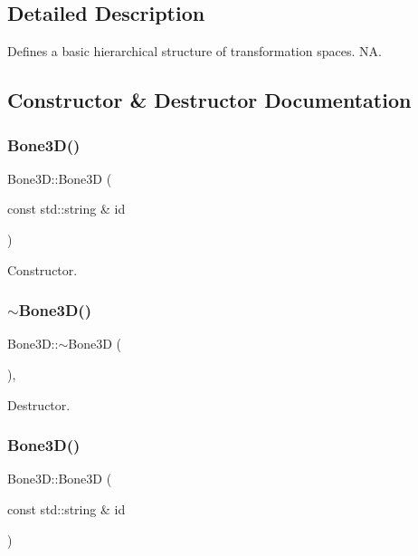 \subsection{Detailed Description}
Defines a basic hierarchical structure of transformation spaces.  NA. 

\subsection{Constructor \& Destructor Documentation}
\mbox{\label{classBone3D_a3e3acf00c8e4393609c241f82db764b7}} 
\subsubsection{\texorpdfstring{Bone3\+D()}{Bone3D()}\hspace{0.1cm}{\footnotesize\ttfamily [1/2]}}
{\footnotesize\ttfamily Bone3\+D\+::\+Bone3D (\begin{DoxyParamCaption}\item[{const std\+::string \&}]{id }\end{DoxyParamCaption})\hspace{0.3cm}{\ttfamily [protected]}}

Constructor. \mbox{\label{classBone3D_a98adf937eb08c046d99154ba66c9699d}} 
\subsubsection{\texorpdfstring{$\sim$\+Bone3\+D()}{~Bone3D()}\hspace{0.1cm}{\footnotesize\ttfamily [1/2]}}
{\footnotesize\ttfamily Bone3\+D\+::$\sim$\+Bone3D (\begin{DoxyParamCaption}{ }\end{DoxyParamCaption})\hspace{0.3cm}{\ttfamily [protected]}, {\ttfamily [virtual]}}

Destructor. \mbox{\label{classBone3D_a3e3acf00c8e4393609c241f82db764b7}} 
\subsubsection{\texorpdfstring{Bone3\+D()}{Bone3D()}\hspace{0.1cm}{\footnotesize\ttfamily [2/2]}}
{\footnotesize\ttfamily Bone3\+D\+::\+Bone3D (\begin{DoxyParamCaption}\item[{const std\+::string \&}]{id }\end{DoxyParamCaption})\hspace{0.3cm}{\ttfamily [protected]}}

